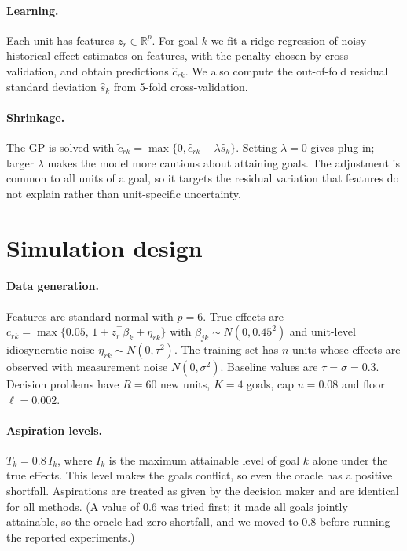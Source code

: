 \documentclass[11pt,a4paper]{article}
\begin{document}
\paragraph{Learning.} Each unit has features $z_r\in\mathbb{R}^p$. For goal $k$ we fit a ridge regression \citep{hoerl1970} of noisy historical effect estimates on features, with the penalty chosen by cross-validation, and obtain predictions $\hat c_{rk}$. We also compute the out-of-fold residual standard deviation $\hat s_k$ from 5-fold cross-validation.

\paragraph{Shrinkage.} The GP is solved with $\tilde c_{rk}=\max\{0,\hat c_{rk}-\lambda \hat s_k\}$. Setting $\lambda=0$ gives plug-in; larger $\lambda$ makes the model more cautious about attaining goals. The adjustment is common to all units of a goal, so it targets the residual variation that features do not explain rather than unit-specific uncertainty.

\section{Simulation design}
\paragraph{Data generation.} Features are standard normal with $p=6$. True effects are $c_{rk}=\max\{0.05,\,1+z_r^\top\beta_k+\eta_{rk}\}$ with $\beta_{jk}\sim N(0,0.45^2)$ and unit-level idiosyncratic noise $\eta_{rk}\sim N(0,\tau^2)$. The training set has $n$ units whose effects are observed with measurement noise $N(0,\sigma^2)$. Baseline values are $\tau=\sigma=0.3$. Decision problems have $R=60$ new units, $K=4$ goals, cap $u=0.08$ and floor $\ell=0.002$.

\paragraph{Aspiration levels.} $T_k=0.8\,I_k$, where $I_k$ is the maximum attainable level of goal $k$ alone under the true effects. This level makes the goals conflict, so even the oracle has a positive shortfall. Aspirations are treated as given by the decision maker and are identical for all methods. (A value of $0.6$ was tried first; it made all goals jointly attainable, so the oracle had zero shortfall, and we moved to $0.8$ before running the reported experiments.)
\end{document}
